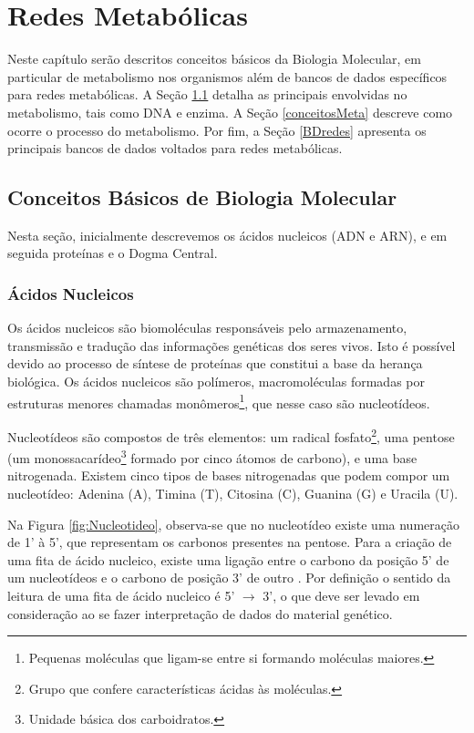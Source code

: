\chapter{Redes Metabólicas}
 
\indent Neste capítulo serão descritos conceitos básicos da Biologia Molecular, em particular de metabolismo nos organismos além de bancos de dados específicos para redes metabólicas. A Seção \ref{conceitosBM} detalha as principais envolvidas no metabolismo, tais como DNA e enzima. A Seção \ref{conceitosMeta} descreve como ocorre o processo do metabolismo. Por fim, a Seção \ref{BDredes} apresenta os principais bancos de dados voltados para redes metabólicas.



\section{Conceitos Básicos de Biologia Molecular} \label{conceitosBM}

\indent Nesta seção, inicialmente descrevemos os ácidos nucleicos (ADN e ARN), e em seguida proteínas e o Dogma Central.

\subsection{Ácidos Nucleicos} \label{aceidosNucleicos}

\indent Os ácidos nucleicos são biomoléculas responsáveis pelo armazenamento, transmissão e tradução das informações genéticas dos seres vivos. Isto é possível devido ao processo de síntese de proteínas que constitui a base da herança biológica. Os ácidos nucleicos são polímeros, macromoléculas formadas por estruturas menores chamadas monômeros\footnote{Pequenas moléculas que ligam-se entre si formando moléculas maiores.}, que nesse caso são nucleotídeos.

\indent Nucleotídeos são compostos de três elementos: um radical fosfato\footnote{Grupo que confere características ácidas às moléculas.}, uma pentose (um monossacarídeo\footnote{Unidade básica dos carboidratos.} formado por cinco átomos de carbono), e uma base nitrogenada. Existem cinco tipos de bases nitrogenadas que podem compor um nucleotídeo: Adenina (A), Timina (T), Citosina (C), Guanina (G) e Uracila (U).

\indent Na Figura \ref{fig:Nucleotideo}, observa-se que no nucleotídeo existe uma numeração de 1' à 5', que representam os carbonos presentes na pentose. Para a criação de uma fita de ácido nucleico, existe uma ligação entre o carbono da posição 5' de um nucleotídeos e o carbono de posição 3' de outro \cite{setubal97}. Por definição o sentido da leitura de uma fita de ácido nucleico é 5' $\rightarrow$ 3', o que deve ser levado em consideração ao se fazer interpretação de dados do material genético.

